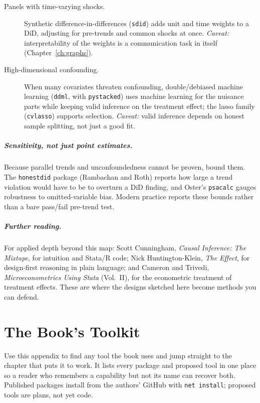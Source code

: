 \documentclass[
    a4paper,
    fontsize=10pt,
    twoside=true,
    numbers=noenddot,
]{kaobook}
\begin{document}
\begin{description}
    \item[Panels with time-varying shocks.] Synthetic difference-in-differences (\texttt{sdid}) adds unit and time weights to a DiD, adjusting for pre-trends and common shocks at once. \emph{Caveat:} interpretability of the weights is a communication task in itself (Chapter~\ref{ch:graphs}).
    \item[High-dimensional confounding.] When many covariates threaten confounding, double/debiased machine learning (\texttt{ddml}, with \texttt{pystacked}) uses machine learning for the nuisance parts while keeping valid inference on the treatment effect; the lasso family (\texttt{cvlasso}) supports selection. \emph{Caveat:} valid inference depends on honest sample splitting, not just a good fit.
\end{description}

\paragraph{Sensitivity, not just point estimates.} Because parallel trends and unconfoundedness cannot be proven, bound them. The \texttt{honestdid} package (Rambachan and Roth) reports how large a trend violation would have to be to overturn a DiD finding, and Oster's \texttt{psacalc} gauges robustness to omitted-variable bias. Modern practice reports these bounds rather than a bare pass/fail pre-trend test.

\paragraph{Further reading.} For applied depth beyond this map: Scott Cunningham, \emph{Causal Inference: The Mixtape}, for intuition and Stata/R code; Nick Huntington-Klein, \emph{The Effect}, for design-first reasoning in plain language; and Cameron and Trivedi, \emph{Microeconometrics Using Stata} (Vol.~II), for the econometric treatment of treatment effects. These are where the designs sketched here become methods you can defend.

\chapter{The Book's Toolkit}\label{app:toolkit}
Use this appendix to find any tool the book uses and jump straight to the chapter that puts it to work. It lists every package and proposed tool in one place so a reader who remembers a capability but not its name can recover both. Published packages install from the authors' GitHub with \texttt{net install}; proposed tools are plans, not yet code.
\end{document}
